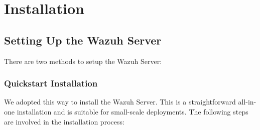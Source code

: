\newpage
\section{Installation}
\subsection{Setting Up the Wazuh Server}

There are two methods to setup the Wazuh Server:

\subsubsection{Quickstart Installation}
We adopted this way to install the Wazuh Server. This is a straightforward all-in-one installation and is suitable for small-scale deployments. The following steps are involved in the installation process:
